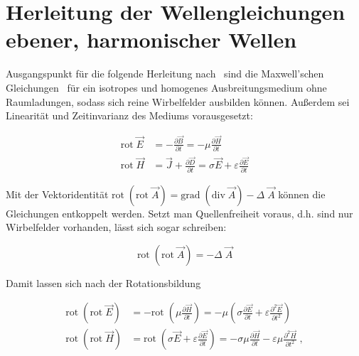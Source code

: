 \chapter{Herleitung der Wellengleichungen ebener, harmonischer Wellen}\label{Anhang:Herleitung_Wellengleichung}

Ausgangspunkt für die folgende Herleitung nach~\cite{EM_Schirmung} sind die Maxwell'schen Gleichungen~\cite{Maxwell} für ein isotropes und homogenes Ausbreitungsmedium ohne Raumladungen, sodass sich reine Wirbelfelder ausbilden können. Außerdem sei Linearität und Zeitinvarianz des Mediums vorausgesetzt:

\begin{subequations}
    \begin{align}
        \text{rot} \; \vec E &= - \frac{\partial \vec B}{\partial t} = - \mu \frac{\partial  \vec H}{\partial t} \\
        \text{rot} \; \vec H &= \vec J + \frac{\partial  \vec D}{\partial t} = \sigma \vec E + \varepsilon \frac{\partial  \vec E}{\partial t}
    \end{align}
\end{subequations}

Mit der Vektoridentität $\text{rot} \; (\text{rot} \; \vec A) = \text{grad} \; (\text{div} \; \vec A) - \Delta \; \vec A$ \cite{Merzinger} können die Gleichungen entkoppelt werden. Setzt man Quellenfreiheit voraus, d.h. sind nur Wirbelfelder vorhanden, lässt sich sogar schreiben:

\begin{equation}
    \text{rot} \; (\text{rot} \; \vec A) = - \Delta \; \vec A
\end{equation}

Damit lassen sich nach der Rotationsbildung 

\begin{subequations}
    \begin{align}
        \text{rot} \; (\text{rot} \; \vec E) &= - \text{rot} \; (\mu \frac{\partial  \vec H}{\partial t}) = - \mu \left(\sigma \frac{\partial  \vec E}{\partial t} + \varepsilon \frac{\partial ^2\vec E}{\partial t^2}\right) \\
        \text{rot} \; (\text{rot} \; \vec H) &= \text{rot} \; (\sigma \vec E + \varepsilon \frac{\partial  \vec E}{\partial t}) = - \sigma \mu \frac{\partial \vec H}{\partial t} - \varepsilon \mu \frac{\partial ^2 \vec H}{\partial t^2} \; ,
    \end{align}
\end{subequations}

